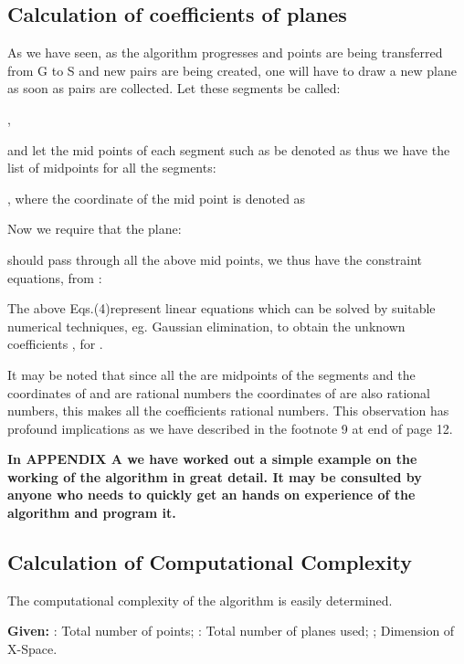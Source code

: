 \documentclass[english]{article}
\begin{document}
\subsection{Calculation of coefficients of planes}

As we have seen, as the algorithm progresses and points are being transferred from G to S and new pairs are being created, one will have to draw a new plane as soon as  pairs are collected. Let these  segments be called:

 ,
 
 and let the mid points of each segment such as  be denoted as  thus we have the list of midpoints for all the  segments:
 
  , where the coordinate of the  mid point is denoted as 
  
  Now we require that the  plane:  
 

should pass through all the above  mid points, we thus have the  constraint equations, from  :



The above Eqs.(4)represent  linear equations which can be solved by suitable numerical techniques, eg. Gaussian elimination, to obtain the  unknown coefficients , for . 

It may be noted that since all the   are midpoints of the segments  and the coordinates of  and  are rational numbers the coordinates of   are also rational numbers, this makes all the coefficients 
 rational numbers. This observation has profound implications as we have described in the footnote 9 at end of page 12.


\medskip{}
 \textbf{ In APPENDIX A we have worked out a simple example on the
working of the algorithm in great detail. It may be consulted by anyone
who needs to quickly get an hands on experience of the algorithm and
program it.} \medskip{}
 


\subsection{Calculation of Computational Complexity}

The computational complexity of the algorithm is easily determined.

\textbf{Given:} : Total number of points;  : Total
number of planes used; ; Dimension of X-Space.
\end{document}
